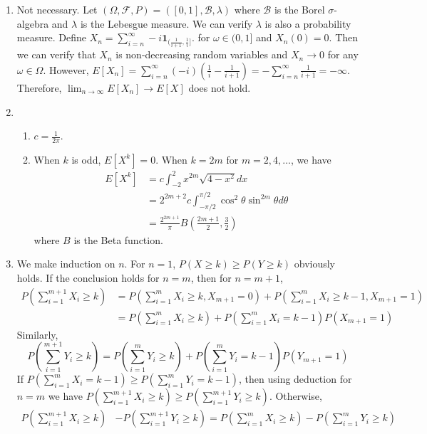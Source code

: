 \documentclass{article}
\begin{document}
\courseheader
{}

\begin{enumerate}
\item Not necessary. Let $(\Omega, \mathcal{F}, P)=([0,1],
\mathcal{B}, \lambda)$ where $\mathcal{B}$ is the Borel $\sigma$-algebra
and $\lambda$ is the Lebesgue measure. We can verify
$\lambda$
is also a probability measure. Define
$X_n = \sum_{i=n}^{\infty} -i \mathbf{1}_{(\frac{1}{i+1}, \frac{1}{i}]}$.
for $\omega \in (0,1]$ and $X_n(0)=0$. Then we can verify that
$X_n$ is non-decreasing random variables and $X_n \to 0$ for any
$\omega \in \Omega$. However, $E[X_n] = \sum_{i=n}^{\infty}(-i)(\frac{1}{i}-\frac{1}{i+1})=-\sum_{i=n}^{\infty}
\frac{1}{i+1}=-\infty$. Therefore, $\lim_{n\to \infty} E[X_n] \to E[X]$
does not hold.

\item 
\begin{enumerate}
    \item $c=\frac{1}{2\pi}$.
\item When $k$ is odd, $E[X^k]=0$. When $k=2m$ for $m=2,4,\dots$,
we have
\begin{align*}
    E[X^k] &= c\int_{-2}^{2} x^{2m}\sqrt{4-x^2}dx \\
    &= 2^{2m+2} c \int_{-\pi/2}^{\pi/2} \cos^2 \theta \sin^{2m} \theta d\theta\\
    &=\frac{2^{2m+1}}{\pi}B(\frac{2m+1}{2},\frac{3}{2})
\end{align*}
where $B$ is the Beta function.
\end{enumerate}
\item We make induction on $n$. For $n=1$, $P(X\geq k) \geq P(Y\geq k)$
obviously holds. If the conclusion holds for $n=m$,
then for $n=m+1$, 
\begin{align*}
P(\sum_{i=1}^{m+1} X_{i} \geq k) 
&= P(\sum_{i=1}^{m} X_{i} \geq k, X_{m+1}=0) + P(\sum_{i=1}^{m} X_{i} \geq k-1, X_{m+1}=1)\\
&= P(\sum_{i=1}^{m} X_{i} \geq k) + P(\sum_{i=1}^{m} X_{i} = k-1)P(X_{m+1}=1)
\end{align*}
Similarly, 
$$
P(\sum_{i=1}^{m+1} Y_{i} \geq k) = P(\sum_{i=1}^{m} Y_{i} \geq k) + P(\sum_{i=1}^{m} Y_{i} = k-1)P(Y_{m+1}=1)
$$
If $P(\sum_{i=1}^{m} X_{i} = k-1) \geq P(\sum_{i=1}^{m} Y_{i} = k-1)$, then
using deduction for $n=m$ we have 
$P(\sum_{i=1}^{m+1} X_{i} \geq k)  \geq P(\sum_{i=1}^{m+1} Y_{i} \geq k) $.
Otherwise,
\begin{align*}
    P(\sum_{i=1}^{m+1} X_{i} \geq k) 
    &- P(\sum_{i=1}^{m+1} Y_{i} \geq k)
    =P(\sum_{i=1}^{m} X_{i} \geq k)- P(\sum_{i=1}^{m} Y_{i} \geq k)\\

\end{align*}
\end{enumerate}
\end{document}
